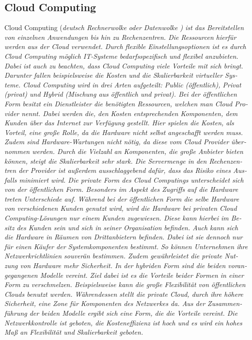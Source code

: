 \begin{otherlanguage}{ngerman}
\subsection{Cloud Computing}
Cloud Computing (\it deutsch Rechnerwolke oder Datenwolke \rm) ist das Bereitstellen von einzelnen Anwendungen bis hin zu Rechenzentren. Die Ressourcen hierfür werden aus der \it Cloud \rm verwendet. Durch flexible Einstellungsoptionen ist es durch Cloud Computing möglich IT-Systeme bedarfsspezifisch und flexibel anzubieten. Dabei ist auch zu beachten, dass Cloud Computing viele Vorteile mit sich bringt. Darunter fallen beispielsweise die Kosten und die Skalierbarkeit virtueller Systeme. 
\newline 
Cloud Computing wird in drei Arten aufgeteilt: Public (öffentlich), Privat (privat) und Hybrid (Mischung aus öffentlich und privat). Bei der öffentlichen Form besitzt ein Dienstleister die benötigten Ressourcen, welchen man \it Cloud Provider \rm nennt. Dabei werden die, den Kosten entsprechenden Komponenten, dem Kunden über das Internet zur Verfügung gestellt. Hier spielen die Kosten, als Vorteil, eine große Rolle, da die Hardware nicht selbst angeschafft werden muss. Zudem sind Hardware-Wartungen nicht nötig, da diese vom \it Cloud Provider \rm übernommen werden. Durch die Vielzahl an Komponenten, die große Anbieter bieten können, steigt die Skalierbarkeit sehr stark. Die Servermenge in den Rechenzentren der Provider ist außerdem ausschlaggebend dafür, dass das Risiko eines Ausfalls minimiert wird. 
\newline
Die private Form des Cloud Computings unterscheidet sich von der öffentlichen Form. Besonders im Aspekt des Zugriffs auf die Hardware treten Unterschiede auf. Während bei der öffentlichen Form die selbe Hardware von verschiedenen Kunden genutzt wird, wird die Hardware bei privaten Cloud Computing-Lösungen nur einem Kunden zugewiesen. Diese kann hierbei im Besitz des Kunden sein und sich in seiner Organisation befinden. Auch kann sich die Hardware in Räumen von Drittanbietern befinden. Dabei ist sie dennoch nur für einen Käufer der Systemkomponenten bestimmt. So können Unternehmen ihre Netzwerkrichtlinien souverän bestimmen. Zudem gewährleistet die private Nutzung von Hardware mehr Sicherheit. 
\newline
In der hybriden Form sind die beiden vorangegangenen Modelle vereint. Ziel dabei ist es die Vorteile beider Formen in einer Form zu verschmelzen. Beispielsweise kann die große Flexibilität von öffentlichen Clouds benutzt werden. Währendessen stellt die private Cloud, durch ihre höhere Sicherheit, eine Zone für Komponenten des Netzwerkes da. Aus der Zusammenführung der beiden Modelle ergibt sich eine Form, die die Vorteile vereint. Die Netzwerkkontrolle ist geboten, die Kosteneffizienz ist hoch und es wird ein hohes Maß an Flexibilität und Skalierbarkeit geboten. 


\end{otherlanguage}
